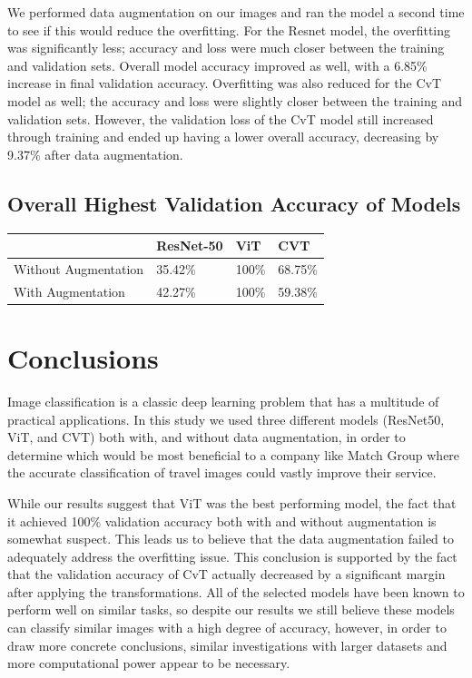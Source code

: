 \documentclass{article}
\begin{document}
\begin{table}[h!]
\begin{center}
\begin{tabular}{|c|c|c|}
		\end{tabular}
	\end{center}
\end{table}

We performed data augmentation on our images and ran the model a second time to see if this would reduce the overfitting. For the Resnet model, the overfitting was significantly less; accuracy and loss were much closer between the training and validation sets. Overall model accuracy improved as well, with a 6.85\% increase in final validation accuracy. Overfitting was also reduced for the CvT model as well; the accuracy and loss were slightly closer between the training and validation sets. However, the validation loss of the CvT model still increased through training and ended up having a lower overall accuracy, decreasing by 9.37\% after data augmentation. 

\FloatBarrier
\subsection{Overall Highest Validation Accuracy of Models}

\begin{tabular}{|p{1.3in}|p{1.3in}|p{1.3in}|p{1.3cm}|}
	\hline 
	\rule{0pt}{20pt}
	& ResNet-50 & ViT & CVT \\
	\hline 
	\rule{0pt}{20pt}
	Without Augmentation & 35.42\% & 100\% & 68.75\% \\
	\hline 
	\rule{0pt}{20pt}
	With Augmentation & 42.27\% & 100\% & 59.38\% \\
	\hline
\end{tabular}
	
\section{Conclusions}

Image classification is a classic deep learning problem that has a multitude of practical applications. In this study we used three different models (ResNet50, ViT, and CVT) both with, and without data augmentation, in order to determine which would be most beneficial to a company like Match Group where the accurate classification of travel images could vastly improve their service.

While our results suggest that ViT was the best performing model, the fact that it achieved 100\% validation accuracy both with and without augmentation is somewhat suspect. This leads us to believe that the data augmentation failed to adequately address the overfitting issue. This conclusion is supported by the fact that the validation accuracy of CvT actually decreased by a significant margin after applying the transformations. All of the selected models have been known to perform well on similar tasks, so despite our results we still believe these models can classify similar images with a high degree of accuracy, however, in order to draw more concrete conclusions, similar investigations with larger datasets and more computational power appear to be necessary.
\end{document}
